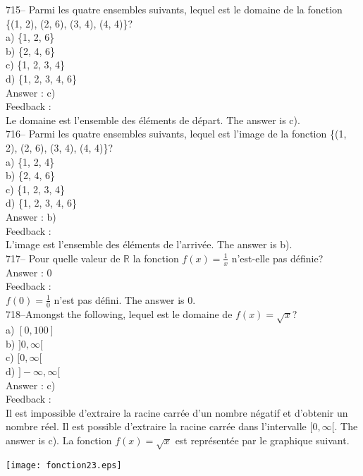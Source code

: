 \documentclass[letterpaper, 12pt]{article}
\begin{document}
715--  Parmi les quatre ensembles suivants, lequel est le domaine de la
fonction \{(1, 2), (2, 6), (3, 4), (4, 4)\}?\\
a) \{1, 2, 6\}\\
b) \{2, 4, 6\}\\
c) \{1, 2, 3, 4\}\\
d) \{1, 2, 3, 4, 6\}\\

Answer : c)\\

Feedback : \\
Le domaine est l'ensemble des \'el\'ements de d\'epart.  The answer is
c).\\

716--  Parmi les quatre ensembles suivants, lequel est l'image de la
fonction \{(1, 2), (2, 6), (3, 4), (4, 4)\}?\\
a) \{1, 2, 4\}\\
b) \{2, 4, 6\}\\
c) \{1, 2, 3, 4\}\\
d) \{1, 2, 3, 4, 6\}\\

Answer : b)\\

Feedback : \\
L'image est l'ensemble des \'el\'ements de l'arriv\'ee.  The answer is
b).\\

717-- Pour quelle valeur de $\mathbb{R}$ la fonction $f(x)=\frac{1}{x}$
n'est-elle pas d\'efinie?\\

Answer : 0\\

Feedback :\\
$f(0)=\frac{1}{0}$ n'est pas d\'efini.  The answer is 0.\\

718--Amongst the following, lequel est le domaine de
$f(x)=\sqrt{x}$?\\
a) $[0,100]$\\
b) $]0,\infty[$\\
c) $[0,\infty[$\\
d) $]-\infty, \infty[$\\

Answer : c)\\

Feedback : \\
Il est impossible d'extraire la racine carr\'ee d'un nombre n\'egatif et
d'obtenir un nombre r\'eel.  Il est possible d'extraire la racine carr\'ee
dans l'intervalle $[0,\infty[$.  The answer is c).  La fonction
$f(x)=\sqrt{x}$ est repr\'esent\'ee par le graphique suivant.\\
    \begin{center}
    \texttt{[image: fonction23.eps]}
    \end{center}
\end{document}
